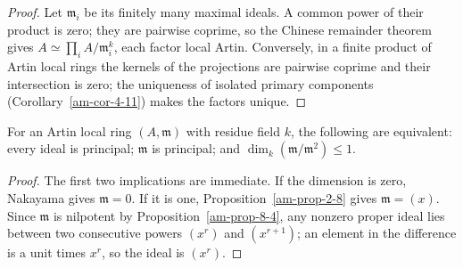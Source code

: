 \begin{proof}
Let $\mathfrak{m}_i$ be its finitely many maximal ideals.  A common power of their
product is zero; they are pairwise coprime, so the Chinese remainder theorem
gives $A\simeq\prod_iA/\mathfrak{m}_i^k$, each factor local Artin.  Conversely, in a
finite product of Artin local rings the kernels of the projections are pairwise
coprime and their intersection is zero; the uniqueness of isolated primary
components (Corollary~\ref{am-cor-4-11}) makes the factors unique.
\end{proof}
\begin{proposition}
\label{am-prop-8-8}
\uses{}
For an Artin local ring $(A,\mathfrak{m})$ with residue field $k$, the following are
equivalent: every ideal is principal; $\mathfrak{m}$ is principal; and
$\dim_k(\mathfrak{m}/\mathfrak{m}^2)\le1$.
\end{proposition}
\begin{proof}
The first two implications are immediate.  If the dimension is zero,
Nakayama gives $\mathfrak{m}=0$.  If it is one, Proposition~\ref{am-prop-2-8} gives
$\mathfrak{m}=(x)$.  Since $\mathfrak{m}$ is nilpotent by Proposition~\ref{am-prop-8-4}, any
nonzero proper ideal lies between two consecutive powers $(x^r)$ and
$(x^{r+1})$; an element in the difference is a unit times $x^r$, so the ideal
is $(x^r)$.
\end{proof}
